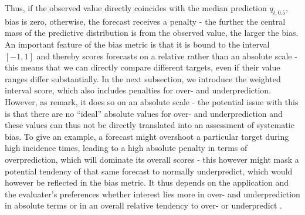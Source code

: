 Thus, if the observed value directly coincides with the median prediction $q_{t, 0.5}$, bias is zero, otherwise, the forecast receives a penalty - the further the central mass of the predictive distribution is from the observed value, the larger the bias.
An important feature of the bias metric is that it is bound to the interval $[-1,1]$ and thereby scores forecasts on a relative rather than an absolute scale - this means that we can directly compare different targets, even if their value ranges differ substantially.
In the next subsection, we introduce the weighted interval score, which also includes penalties for over- and underprediction. However, as \citep{bosse_evaluating_2022} remark, it does so on an absolute scale - the potential issue with this is that there are no ``ideal'' absolute values for over- and underprediction and these values can thus not be directly translated into an assessment of systematic bias. To give an example, a forecast might overshoot a particular target during high incidence times, leading to a high absolute penalty in terms of overprediction, which will dominate its overall scores - this however might mask a potential tendency of that same forecast to normally underpredict, which would however be reflected in the bias metric. It thus depends on the application and the evaluater's preferences whether interest lies more in over- and underprediction in absolute terms or in an overall relative tendency to over- or underpredict  \citep{bosse_evaluating_2022}.\\
